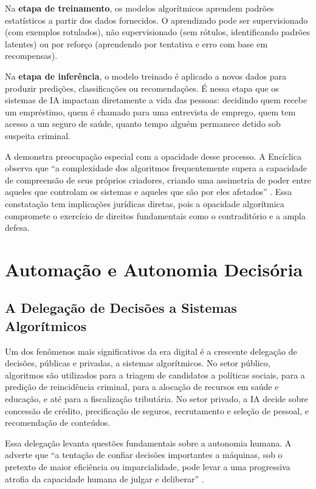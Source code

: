 Na \textbf{etapa de treinamento}, os modelos algorítmicos aprendem padrões estatísticos a partir dos dados fornecidos. O aprendizado pode ser supervisionado (com exemplos rotulados), não supervisionado (sem rótulos, identificando padrões latentes) ou por reforço (aprendendo por tentativa e erro com base em recompensas).

Na \textbf{etapa de inferência}, o modelo treinado é aplicado a novos dados para produzir predições, classificações ou recomendações. É nessa etapa que os sistemas de IA impactam diretamente a vida das pessoas: decidindo quem recebe um empréstimo, quem é chamado para uma entrevista de emprego, quem tem acesso a um seguro de saúde, quanto tempo alguém permanece detido sob suspeita criminal.

A \MH{} demonstra preocupação especial com a opacidade desse processo. A Encíclica observa que ``a complexidade dos algoritmos frequentemente supera a capacidade de compreensão de seus próprios criadores, criando uma assimetria de poder entre aqueles que controlam os sistemas e aqueles que são por eles afetados'' \cite{LeaoXIV2026MH}. Essa constatação tem implicações jurídicas diretas, pois a opacidade algorítmica compromete o exercício de direitos fundamentais como o contraditório e a ampla defesa.

\section{Automação e Autonomia Decisória}
\label{sec:automacao}

\subsection{A Delegação de Decisões a Sistemas Algorítmicos}
\label{subsec:delegacao-decisoria}

Um dos fenômenos mais significativos da era digital é a crescente delegação de decisões, públicas e privadas, a sistemas algorítmicos. No setor público, algoritmos são utilizados para a triagem de candidatos a políticas sociais, para a predição de reincidência criminal, para a alocação de recursos em saúde e educação, e até para a fiscalização tributária. No setor privado, a IA decide sobre concessão de crédito, precificação de seguros, recrutamento e seleção de pessoal, e recomendação de conteúdos.

Essa delegação levanta questões fundamentais sobre a autonomia humana. A \MH{} adverte que ``a tentação de confiar decisões importantes a máquinas, sob o pretexto de maior eficiência ou imparcialidade, pode levar a uma progressiva atrofia da capacidade humana de julgar e deliberar'' \cite{LeaoXIV2026MH}.

